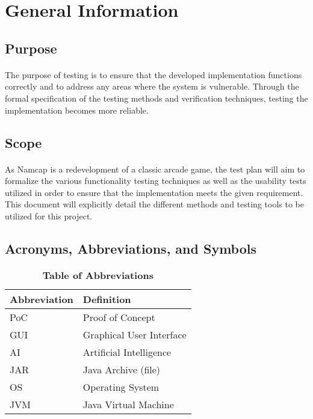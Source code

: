 \documentclass[12pt, titlepage]{article}
\begin{document}
\section{General Information}

\subsection{Purpose}
\paragraph{}
The purpose of testing is to ensure that the developed implementation functions correctly and to address any areas where the system is vulnerable. Through the formal specification of the testing methods and verification techniques, testing the implementation becomes more reliable.

\subsection{Scope}
\paragraph{}
As Namcap is a redevelopment of a classic arcade game, the test plan will aim to formalize the various functionality testing techniques as well as the usability tests utilized in order to ensure that the implementation meets the given requirement. This document will explicitly detail the different methods and testing tools to be utilized for this project.

\subsection{Acronyms, Abbreviations, and Symbols}
	
\begin{table}[hbp]
\caption{\textbf{Table of Abbreviations}} \label{Table}

\begin{tabularx}{\textwidth}{p{3cm}X}
\toprule
\textbf{Abbreviation} & \textbf{Definition} \\
\midrule
PoC & Proof of Concept\\
GUI & Graphical User Interface\\
AI & Artificial Intelligence\\
JAR & Java Archive (file)\\
OS & Operating System\\
JVM & Java Virtual Machine\\
\bottomrule
\end{tabularx}

\end{table}
\end{document}
